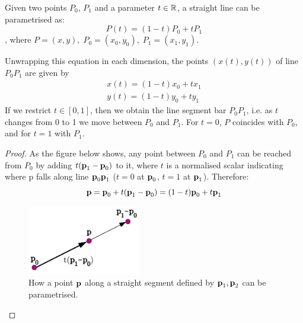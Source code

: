 \documentclass[a4paper]{article}
\begin{document}
\begin{lemma}
Given two points $P_0$, $P_1$ and a parameter $t\in\mathbb{R}$, a straight line can be parametrised as:
\begin{equation}
P(t) = (1-t)P_0 + tP_1
\end{equation}
, where $P = (x,y),\; P_0=(x_0,y_0), \; P_1=(x_1,y_1)$.
\end{lemma}
Unwrapping this equation in each dimension, the points $(x(t), y(t))$ of line $P_0P_1$ are given by 
\begin{align*}
x(t) = (1-t)x_0 + tx_1\\
y(t) = (1-t)y_0 + ty_1
\end{align*}
If we restrict $t\in[0,1]$, then we obtain the line segment bar $P_0P_1$, i.e. as $t$ changes from 0 to 1 we move between $P_0$ and $P_1$. For $t=0$, $P$ coincides with $P_0$, and for $t=1$ with $P_1$.
\begin{proof}
    As the figure below shows, any point between $P_0$ and $P_1$ can be reached from $P_0$ by adding $t(\textbf{p}_1-\textbf{p}_0)$ to it, where $t$ is a normalised scalar indicating where p falls along line $\textbf{p}_0\textbf{p}_1$ ($t=0$ at $\textbf{p}_0$, $t=1$ at $\textbf{p}_1$). Therefore:
\[
    \textbf{p}=\textbf{p}_0+t(\textbf{p}_1-\textbf{p}_0) = (1-t)\textbf{p}_0 + t\textbf{p}_1
\]
\begin{figure}[H]
    \centering
    \includegraphics[height=3cm]{img/bezier/param_straight_line.png}
    \caption{How a point $\textbf{p}$ along a straight segment defined by $\textbf{p}_1,\textbf{p}_2$ can be parametrised.}%
\end{figure}
\end{proof}

\newpage
\end{document}
